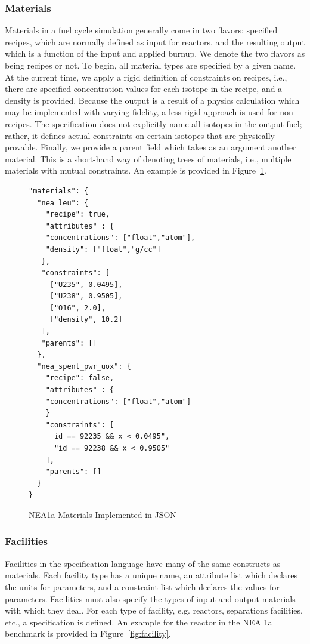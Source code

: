 \documentclass{anstrans}
\begin{document}
\subsubsection{Materials}
Materials in a fuel cycle simulation generally come in two flavors: specified
recipes, which are normally defined as input for reactors, and the resulting
output which is a function of the input and applied burnup. We denote the two
flavors as being recipes or not. To begin, all material types are specified by a
given name. At the current time, we apply a rigid definition of constraints on
recipes, i.e., there are specified concentration values for each isotope in the
recipe, and a density is provided. Because the output is a result of a physics
calculation which may be implemented with varying fidelity, a less rigid
approach is used for non-recipes. The specification does not explicitly name all
isotopes in the output fuel; rather, it defines actual constraints on certain
isotopes that are physically provable. Finally, we provide a parent field which
takes as an argument another material. This is a short-hand way of denoting
trees of materials, i.e., multiple materials with mutual constraints. An example
is provided in Figure~\ref{fig:material}.

\begin{figure}[h!]
\begin{Verbatim}[frame=single]
"materials": {
  "nea_leu": {
    "recipe": true,
    "attributes" : {
    "concentrations": ["float","atom"],
    "density": ["float","g/cc"]
   },
   "constraints": [        
     ["U235", 0.0495],
     ["U238", 0.9505],
     ["O16", 2.0],
     ["density", 10.2]
   ], 
   "parents": []
  },
  "nea_spent_pwr_uox": {
    "recipe": false,
    "attributes" : {
    "concentrations": ["float","atom"]
    }
    "constraints": [
      id == 92235 && x < 0.0495",
      "id == 92238 && x < 0.9505"
    ], 
    "parents": []
  }
}
\end{Verbatim}
\caption{NEA1a Materials Implemented in JSON}
\label{fig:material}
\end{figure}

\subsubsection{Facilities}
Facilities in the specification language have many of the same constructs as
materials. Each facility type has a unique name, an attribute list which
declares the units for parameters, and a constraint list which declares the
values for parameters. Facilities must also specify the types of input and
output materials with which they deal. For each type of facility, e.g. reactors,
separations facilities, etc., a specification is defined. An example for the
reactor in the NEA 1a benchmark is provided in Figure~\ref{fig:facility}.
\end{document}
